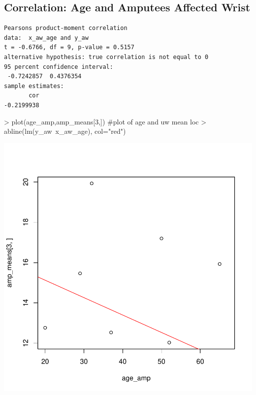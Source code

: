 \documentclass{article}
\begin{document}
\subsection*{Correlation: Age and Amputees Affected Wrist}
\begin{verbatim}
Pearsons product-moment correlation
data:  x_aw_age and y_aw
t = -0.6766, df = 9, p-value = 0.5157
alternative hypothesis: true correlation is not equal to 0
95 percent confidence interval:
 -0.7242857  0.4376354
sample estimates:
       cor 
-0.2199938 
\end{verbatim}
\begin{Schunk}
\begin{Sinput}
> plot(age_amp,amp_means[3,]) #plot of age and uw mean loc
> abline(lm(y_aw~x_aw_age), col="red")
\end{Sinput}
\end{Schunk}
\includegraphics{15_3_20_Loc_results-008}
\end{document}
